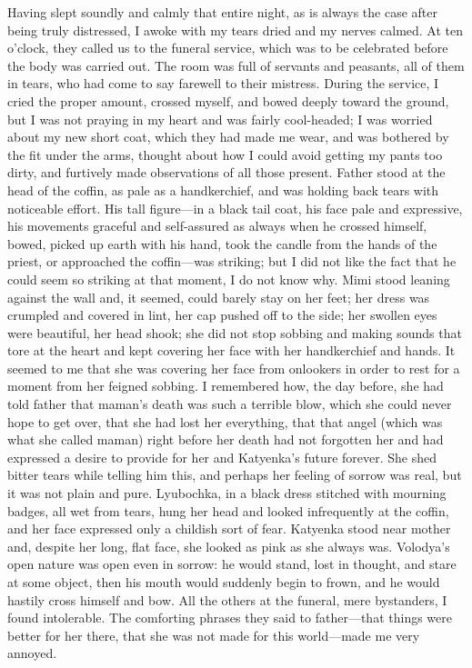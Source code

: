 Having slept soundly and calmly that entire night, as is always the case after being truly distressed, I awoke with my tears dried and my nerves calmed. At ten o'clock, they called us to the funeral service, which was to be celebrated before the body was carried out. The room was full of servants and peasants, all of them in tears, who had come to say farewell to their mistress. During the service, I cried the proper amount, crossed myself, and bowed deeply toward the ground, but I was not praying in my heart and was fairly cool-headed; I was worried about my new short coat, which they had made me wear, and was bothered by the fit under the arms, thought about how I could avoid getting my pants too dirty, and furtively made observations of all those present. Father stood at the head of the coffin, as pale as a handkerchief, and was holding back tears with noticeable effort. His tall figure---in a black tail coat, his face pale and expressive, his movements graceful and self-assured as always when he crossed himself, bowed, picked up earth with his hand, took the candle from the hands of the priest, or approached the coffin---was striking; but I did not like the fact that he could seem so striking at that moment, I do not know why. Mimi stood leaning against the wall and, it seemed, could barely stay on her feet; her dress was crumpled and covered in lint, her cap pushed off to the side; her swollen eyes were beautiful, her head shook; she did not stop sobbing and making sounds that tore at the heart and kept covering her face with her handkerchief and hands. It seemed to me that she was covering her face from onlookers in order to rest for a moment from her feigned sobbing. I remembered how, the day before, she had told father that maman's death was such a terrible blow, which she could never hope to get over, that she had lost her everything, that that angel (which was what she called maman) right before her death had not forgotten her and had expressed a desire to provide for her and Katyenka's future forever. She shed bitter tears while telling him this, and perhaps her feeling of sorrow was real, but it was not plain and pure. Lyubochka, in a black dress stitched with mourning badges, all wet from tears, hung her head and looked infrequently at the coffin, and her face expressed only a childish sort of fear. Katyenka stood near mother and, despite her long, flat face, she looked as pink as she always was. Volodya's open nature was open even in sorrow: he would stand, lost in thought, and stare at some object, then his mouth would suddenly begin to frown, and he would hastily cross himself and bow. All the others at the funeral, mere bystanders, I found intolerable. The comforting phrases they said to father---that things were better for her there, that she was not made for this world---made me very annoyed.

